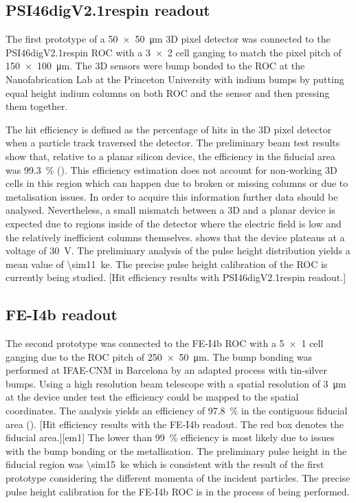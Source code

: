 \subsection{PSI46digV2.1respin readout}
The first prototype of a \SI{50x50}{\micro\meter} 3D pixel detector was connected to the PSI46digV2.1respin \ac{ROC} \cite{kornmayer} with a \SI{3x2}{} cell ganging to match the pixel pitch of \SI{150x100}{\micro\meter}. The 3D sensors were bump bonded to the \ac{ROC} at the Nanofabrication Lab at the Princeton University with indium bumps by putting equal height indium columns on both \ac{ROC} and the sensor and then pressing them together.\par
The hit efficiency is defined as the percentage of hits in the 3D pixel detector when a particle track traversed the detector. The preliminary beam test results show that, relative to a planar silicon device, the efficiency in the fiducial area was \SI{99.3}{\%} (). This efficiency estimation does not account for non-working 3D cells in this region which can happen due to broken or missing columns or due to metalisation issues. In order to acquire this information further data should be analysed. Nevertheless, a small mismatch between a 3D and a planar device is expected due to regions inside of the detector where the electric field is low \cite{guilio} and the relatively inefficient columns themselves.  shows that the device plateaus at a voltage of \SI{30}{\volt}. The preliminary analysis of the pulse height distribution yields a mean value of \SI{\sim11}{\kilo e}. The precise pulse height calibration of the \ac{ROC} is currently being studied.
[Hit efficiency results with PSI46digV2.1respin readout.]
\subsection{FE-I4b readout}
The second prototype was connected to the FE-I4b \ac{ROC} \cite{fei4} with a \SI{5x1}{} cell ganging due to the \ac{ROC} pitch of \SI{250x50}{\micro\meter}. The bump bonding was performed at IFAE-CNM in Barcelona by an adapted process with tin-silver bumps. Using a high resolution beam telescope with a spatial resolution of \SI{3}{\micro\meter} at the device under test the efficiency could be mapped to the spatial coordinates. The analysis yields an efficiency of \SI{97.8}{\%} in the contiguous fiducial area ().
\vspace*{-10pt}[Hit efficiency results with the FE-I4b readout. The red box denotes the fiducial area.][em1]
The lower than \SI{99}{\%} efficiency is most likely due to issues with the bump bonding or the metallisation. The preliminary pulse height in the fiducial region was \SI{\sim15}{\kilo e} which is consistent with the result of the first prototype considering the different momenta of the incident particles. The precise pulse height calibration for the FE-I4b \ac{ROC} is in the process of being performed.
